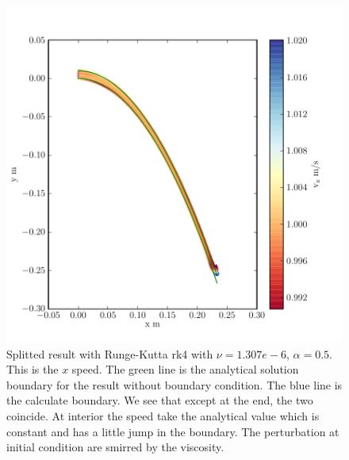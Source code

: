 \begin{figure}
	\includegraphics{topology/lateral_jet/plot_9__1_182.pdf}
		\caption{Splitted result with Runge-Kutta rk4 with $\nu=1.307e-6$, $\alpha=0.5$.
	This is the $x$ speed.
	The green line is the analytical solution boundary for the result without boundary condition.
	The blue line is the calculate boundary.
	We see that except at the end, the two coincide.
	At interior the speed take the analytical value which is constant and has a little jump in the boundary.
	The perturbation at initial condition are smirred by the viscosity.}
	\label{topo:extrap:lateral:9_1}
\end{figure}

